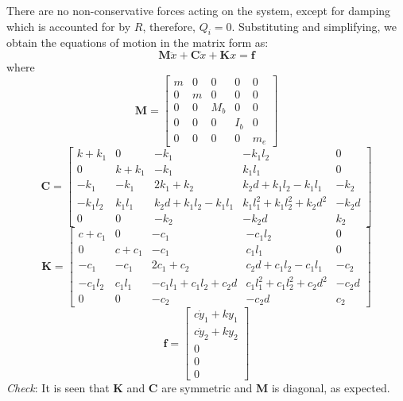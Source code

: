 \documentclass[11pt, oneside]{article}   	%
\begin{document}
There are no non-conservative forces acting on the system, except for damping which is accounted for by $R$, therefore, $Q_i = 0$. Substituting and simplifying, we obtain the equations of motion in the matrix form as:
\begin{equation}
\boldsymbol{M}\ddot{x} + \boldsymbol{C} \dot{x} + \boldsymbol{K} x = \boldsymbol{f}
\end{equation}
where
\[ \textbf{M} = \begin{bmatrix}
m & 0 & 0 & 0 & 0 \\
0 & m & 0 & 0 & 0 \\
0 & 0 & M_b & 0 & 0 \\
0 & 0 & 0 & I_b & 0 \\
0 & 0 & 0 & 0 & m_e
\end{bmatrix} \]
\[ \textbf{C} =  \begin{bmatrix}
k+k_1 & 0 & -k_1 & -k_1 l_2 & 0 \\
0 & k+k_1 & -k_1 & k_1 l_1 & 0 \\
-k_1 & -k_1 & 2k_1+k_2 & k_2d+k_1 l_2 - k_1 l_1 & -k_2 \\
-k_1l_2 & k_1l_1 & k_2d+k_1l_2-k_1l_1 & k_1l_1^2 + k_1l_2^2 + k_2d^2  & -k_2d \\
0 & 0 & -k_2 & -k_2d & k_2
\end{bmatrix} \]
\[ \textbf{K} =  \begin{bmatrix}
c+c_1 & 0 & -c_1 & -c_1 l_2 & 0 \\
0 & c+c_1 & -c_1 & c_1 l_1 & 0 \\
-c_1 & -c_1 & 2c_1+c_2 & c_2d+c_1 l_2 - c_1 l_1 & -c_2 \\
-c_1l_2 & c_1l_1 & -c_1l_1+c_1l_2+c_2d & c_1l_1^2 + c_1l_2^2 + c_2d^2  & -c_2d \\
0 & 0 & -c_2 & -c_2d & c_2
\end{bmatrix} \]
\[ \textbf{f} = \begin{bmatrix}
c \dot{y}_1 + k y_1 \\
c \dot{y}_2 + k y_2\\
0\\
0\\
0
\end{bmatrix} \]
\textit{Check}: It is seen that \textbf{K} and \textbf{C} are symmetric and \textbf{M} is diagonal, as expected.
\end{document}

